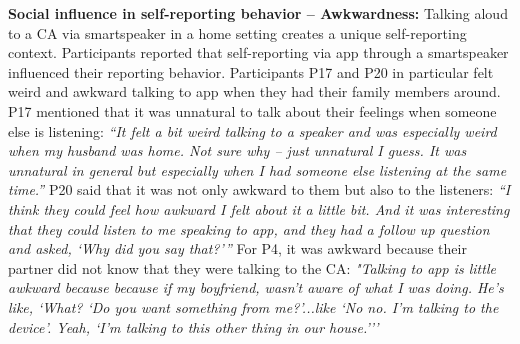     
    \textbf{Social influence in self-reporting behavior -- Awkwardness:}        
        Talking aloud to a \ac{CA} via smartspeaker in a home setting creates a unique self-reporting context. 
        Participants reported that self-reporting via \acl{app} through a smartspeaker influenced their reporting behavior.
        Participants P17 and P20 in particular felt weird and awkward talking to \acl{app} when they had their family members around.
        P17 mentioned that it was unnatural to talk about their feelings when someone else is listening:
            \textit{``It felt a bit weird talking to a speaker and was especially weird when my husband was home. Not sure why – just unnatural I guess.
            It was unnatural in general but especially when I had someone else listening at the same time.''}
        P20 said that it was not only awkward to them but also to the listeners:
            \textit{``I think they could feel how awkward I felt about it a little bit. And it was interesting that they could listen to me speaking to \acl{app}, and they had a follow up question and asked, `Why did you say that?'''}
        For P4, it was awkward because their partner did not know that they were talking to the \ac{CA}:
			\textit{"Talking to \acl{app} is little awkward because because if my boyfriend, wasn't aware of what I was doing. He's like, `What? `Do you want something from me?'...like `No no. I'm talking to the device'. Yeah, `I'm talking to this other thing in our house.'''}
